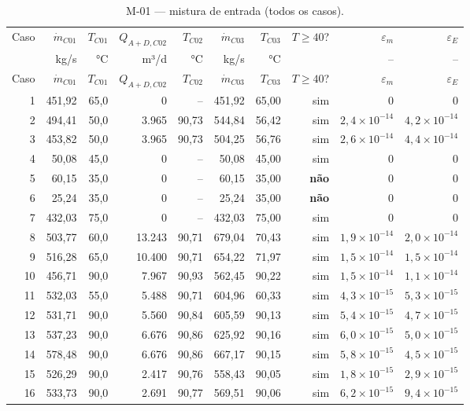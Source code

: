 \documentclass[11pt,a4paper]{article}
\numberwithin{equation}{section}
\numberwithin{table}{section}
\numberwithin{figure}{section}
\begin{document}
{\footnotesize\setlength{\tabcolsep}{3.5pt}\begin{longtable}{rrrrrrrrrr}
\caption{M-01 --- mistura de entrada (todos os casos).\label{tab:b01}}\\\toprule
Caso & $\dot m_{C01}$ & $T_{C01}$ & $Q_{A+D,C02}$ & $T_{C02}$ & $\dot m_{C03}$ & $T_{C03}$ & $T\ge40$? & $\varepsilon_m$ & $\varepsilon_E$\\
 & kg/s & °C & m³/d & °C & kg/s & °C &  & -- & --\\\midrule\endfirsthead
\toprule Caso & $\dot m_{C01}$ & $T_{C01}$ & $Q_{A+D,C02}$ & $T_{C02}$ & $\dot m_{C03}$ & $T_{C03}$ & $T\ge40$? & $\varepsilon_m$ & $\varepsilon_E$\\\midrule\endhead
1 & 451,92 & 65,0 & 0 & -- & 451,92 & 65,00 & sim & $0$ & $0$\\
2 & 494,41 & 50,0 & 3.965 & 90,73 & 544,84 & 56,42 & sim & $2{,}4\times10^{-14}$ & $4{,}2\times10^{-14}$\\
3 & 453,82 & 50,0 & 3.965 & 90,73 & 504,25 & 56,76 & sim & $2{,}6\times10^{-14}$ & $4{,}4\times10^{-14}$\\
4 & 50,08 & 45,0 & 0 & -- & 50,08 & 45,00 & sim & $0$ & $0$\\
5 & 60,15 & 35,0 & 0 & -- & 60,15 & 35,00 & \textbf{não} & $0$ & $0$\\
6 & 25,24 & 35,0 & 0 & -- & 25,24 & 35,00 & \textbf{não} & $0$ & $0$\\
7 & 432,03 & 75,0 & 0 & -- & 432,03 & 75,00 & sim & $0$ & $0$\\
8 & 503,77 & 60,0 & 13.243 & 90,71 & 679,04 & 70,43 & sim & $1{,}9\times10^{-14}$ & $2{,}0\times10^{-14}$\\
9 & 516,28 & 65,0 & 10.400 & 90,71 & 654,22 & 71,97 & sim & $1{,}5\times10^{-14}$ & $1{,}5\times10^{-14}$\\
10 & 456,71 & 90,0 & 7.967 & 90,93 & 562,45 & 90,22 & sim & $1{,}5\times10^{-14}$ & $1{,}1\times10^{-14}$\\
11 & 532,03 & 55,0 & 5.488 & 90,71 & 604,96 & 60,33 & sim & $4{,}3\times10^{-15}$ & $5{,}3\times10^{-15}$\\
12 & 531,71 & 90,0 & 5.560 & 90,84 & 605,59 & 90,13 & sim & $5{,}4\times10^{-15}$ & $4{,}7\times10^{-15}$\\
13 & 537,23 & 90,0 & 6.676 & 90,86 & 625,92 & 90,16 & sim & $6{,}0\times10^{-15}$ & $5{,}0\times10^{-15}$\\
14 & 578,48 & 90,0 & 6.676 & 90,86 & 667,17 & 90,15 & sim & $5{,}8\times10^{-15}$ & $4{,}5\times10^{-15}$\\
15 & 526,29 & 90,0 & 2.417 & 90,76 & 558,43 & 90,05 & sim & $1{,}8\times10^{-15}$ & $2{,}9\times10^{-15}$\\
16 & 533,73 & 90,0 & 2.691 & 90,77 & 569,51 & 90,06 & sim & $6{,}2\times10^{-15}$ & $9{,}4\times10^{-15}$\\
\bottomrule\end{longtable}}
\end{document}
